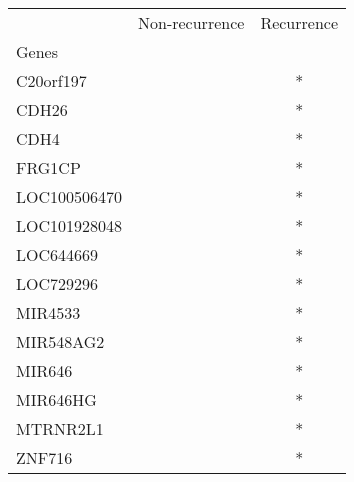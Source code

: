 \begin{tabular}{lcc}
\toprule
{} & Non-recurrence & Recurrence \\
Genes        &                &            \\
\midrule
C20orf197    &                &          * \\
CDH26        &                &          * \\
CDH4         &                &          * \\
FRG1CP       &                &          * \\
LOC100506470 &                &          * \\
LOC101928048 &                &          * \\
LOC644669    &                &          * \\
LOC729296    &                &          * \\
MIR4533      &                &          * \\
MIR548AG2    &                &          * \\
MIR646       &                &          * \\
MIR646HG     &                &          * \\
MTRNR2L1     &                &          * \\
ZNF716       &                &          * \\
\bottomrule
\end{tabular}
